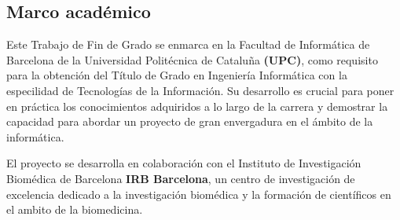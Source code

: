 \subsection{Marco académico}

Este Trabajo de Fin de Grado se enmarca en la Facultad de Informática de Barcelona de la Universidad 
Politécnica de Cataluña \textbf{(UPC)}, como requisito para la obtención del Título de Grado en Ingeniería Informática 
con la especilidad de Tecnologías de la Información. Su desarrollo es crucial para poner en práctica los conocimientos
adquiridos a lo largo de la carrera y demostrar la capacidad para abordar un proyecto de gran envergadura en el ámbito de la informática.

El proyecto se desarrolla en colaboración con el Instituto de Investigación Biomédica de Barcelona \textbf{IRB Barcelona},
un centro de investigación de excelencia dedicado a la investigación biomédica y la formación de científicos en el ambito de la biomedicina.